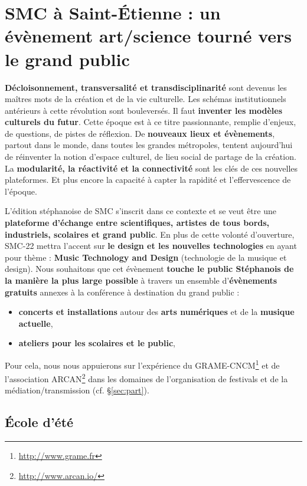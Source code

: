 \documentclass[fontsize=12pt]{scrartcl} %
\numberwithin{equation}{section} %
\numberwithin{table}{section} %
\begin{document}
\section{SMC à Saint-Étienne : un évènement art/science tourné vers le grand public}

\textbf{Décloisonnement, transversalité et transdisciplinarité} sont devenus les maîtres mots de la création et de la vie culturelle. Les schémas institutionnels antérieurs à cette révolution sont bouleversés. Il faut \textbf{inventer les modèles culturels du futur}. Cette époque est à ce titre passionnante, remplie d'enjeux, de questions, de pistes de réflexion. De \textbf{nouveaux lieux et évènements}, partout dans le monde, dans toutes les grandes métropoles, tentent aujourd'hui de réinventer la notion d'espace culturel, de lieu social de partage de la création. La \textbf{modularité, la réactivité et la connectivité} sont les clés de ces nouvelles plateformes. Et plus encore la capacité à capter la rapidité et l'effervescence de l'époque. 

L'édition stéphanoise de SMC s'inscrit dans ce contexte et se veut être une \textbf{plateforme d'échange entre scientifiques, artistes de tous bords, industriels, scolaires et grand public}. En plus de cette volonté d'ouverture, SMC-22 mettra l'accent sur \textbf{le design et les nouvelles technologies} en ayant pour thème : \textbf{Music Technology and Design} (technologie de la musique et design). Nous souhaitons que cet évènement \textbf{touche le public Stéphanois de la manière la plus large possible} à travers un ensemble d'\textbf{évènements gratuits} annexes à la conférence à destination du grand public : 

\begin{itemize}
\item \textbf{concerts et installations} autour des \textbf{arts numériques} et de la \textbf{musique actuelle},
\item \textbf{ateliers pour les scolaires et le public},
\end{itemize}

Pour cela, nous nous appuierons sur l'expérience du GRAME-CNCM\footnote{\url{http://www.grame.fr}} et de l'association ARCAN\footnote{\url{http://www.arcan.io/}} dans les domaines de l'organisation de festivals et de la médiation/transmission (cf. \S\ref{sec:part}).  

\subsection{École d'été}
\label{subsec:summerSchool}
\end{document}
